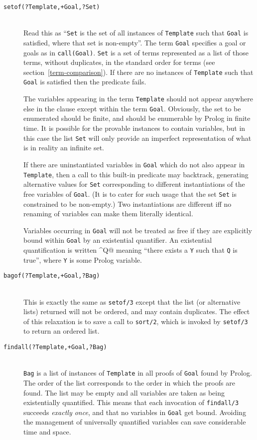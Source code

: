 \begin{description}

\item [{\tt setof(?Template,+Goal,?Set)}]~\\
	Read this as ``{\tt Set} is the set of all instances of
	{\tt Template} such that {\tt Goal} is satisfied, where that set is
	non-empty''.  The term {\tt Goal} specifies a goal or goals as
	in {\tt call(Goal)}.  {\tt Set} is a set of terms represented
	as a list of those terms, without duplicates, in the standard
	order for terms (see section~\ref{term-comparison}).  If there are no
	instances of {\tt Template} such that {\tt Goal} is satisfied
	then the predicate fails.

	The variables appearing in the term {\tt Template} should not
	appear anywhere else in the clause except within the term {\tt Goal}.
	Obviously, the set to be enumerated should be finite, and should be
	enumerable by Prolog in finite time.  It is possible for the provable
	instances to contain variables, but in this case the list
	{\tt Set} will only provide an imperfect representation of
	what is in reality an infinite set.

	If there are uninstantiated variables in {\tt Goal} which do not also
	appear in {\tt Template}, then a call to this built-in predicate may
	backtrack, generating alternative values for {\tt Set}
	corresponding to different instantiations of the free
	variables of {\tt Goal}.  (It is to cater for such usage that
	the set {\tt Set} is constrained to be non-empty.)  Two
	instantiations are different iff no renaming of variables can make
	them literally identical.

	Variables occurring in {\tt Goal} will not be treated as free
	if they are explicitly bound within {\tt Goal} by an existential
	quantifier.  An existential quantification is written \verb@Y^Q@
	meaning ``there exists a {\tt Y} such that {\tt Q} is true'',
	where {\tt Y} is some Prolog variable.  


\item [{\tt bagof(?Template,+Goal,?Bag)}]~\\
	This is exactly the same as {\tt setof/3} except that the list
	(or alternative lists) returned will not be ordered, and may contain
	duplicates.  The effect of this relaxation is to save a call to
	{\tt sort/2}, which is invoked by {\tt setof/3} to return an ordered
	list.  

\item [{\tt findall(?Template,+Goal,?Bag)}]~\\
	{\tt Bag} is a list of instances of {\tt Template} in all
	proofs of {\tt Goal} found by Prolog.  The order of the list
	corresponds to the order in which the proofs are found.  The list may
	be empty and all variables are taken as being existentially
	quantified.  This means that each invocation of {\tt findall/3}
	succeeds {\em exactly once}, and that no variables in {\tt Goal} get
	bound.  Avoiding the management of universally quantified variables
	can save considerable time and space. 



\end{description}
